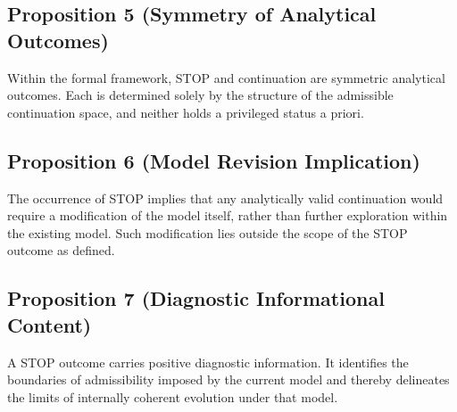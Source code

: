 \subsection*{Proposition 5 (Symmetry of Analytical Outcomes)}
Within the formal framework, STOP and continuation are symmetric analytical outcomes. Each is determined solely by the structure of the admissible continuation space, and neither holds a privileged status a priori.

\subsection*{Proposition 6 (Model Revision Implication)}
The occurrence of STOP implies that any analytically valid continuation would require a modification of the model itself, rather than further exploration within the existing model. Such modification lies outside the scope of the STOP outcome as defined.

\subsection*{Proposition 7 (Diagnostic Informational Content)}
A STOP outcome carries positive diagnostic information. It identifies the boundaries of admissibility imposed by the current model and thereby delineates the limits of internally coherent evolution under that model.
